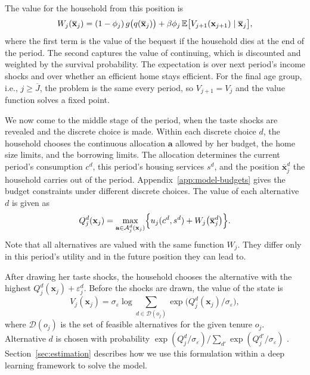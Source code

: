 The value for the household from this position is
\begin{equation}
  W_j(\overline{\mathbf x}_j)=(1-\phi_j)\,g\bigl(q(\overline{\mathbf x}_j)\bigr)
  +\beta\phi_j\,\mathbb E\bigl[V_{j+1}(\mathbf x_{j+1})\mid\overline{\mathbf x}_j\bigr],
  \label{eq:end-value}
\end{equation}
where the  first term is the value of the bequest if the household dies at the end
of the period. The second captures the value of continuing, which is discounted and weighted
by the  survival probability. The expectation  is over next period's income shocks and over
whether an efficient home stays efficient. For the final age group, i.e., $j\geq\overline J$, the
problem is the same every period, so $V_{j+1}=V_j$ and the value function
solves a fixed point.


We now come to the middle stage of the period, when the taste shocks are revealed and the discrete choice is made. Within each discrete choice $d$, the household chooses the continuous allocation $\mathbf a$ allowed by her budget, the home size limits, and the
borrowing limits. The allocation determines the current period's consumption $c^d$, this period's housing
services $s^d$, and the position $\overline{\mathbf x}^d_j$ the household
carries out of the period. Appendix~\ref{app:model-budgets} gives the budget
constraints under different discrete choices. The value of each alternative $d$ is given as
\begin{equation}
  Q_j^d(\mathbf x_j)=\max_{\mathbf a\in\mathcal A_j^d(\mathbf x_j)}
  \Bigl\{u_j(c^d,s^d)+W_j\bigl(\overline{\mathbf x}^d_j\bigr)\Bigr\}.
  \label{eq:choice-value}
\end{equation}
Note that all alternatives are valued with the same function $W_j$.  They differ only
in this period's utility and in the future position they can lead to. 


After drawing her taste shocks, the household chooses the alternative with
the highest $Q_j^d(\mathbf x_j)+\varepsilon_j^d$. Before the shocks are
drawn, the value of the state is
\begin{equation}
  V_j(\mathbf x_j)=\sigma_\varepsilon\log\sum_{d\in\mathcal D(o_j)}
  \exp\!\bigl(Q_j^d(\mathbf x_j)/\sigma_\varepsilon\bigr),
  \label{eq:logsum}
\end{equation}
 where $\mathcal D(o_j)$ is the set of feasible
alternatives for the given tenure $o_j$. Alternative $d$ is chosen with
probability
$\exp(Q_j^d/\sigma_\varepsilon)/\sum_{d'}\exp(Q_j^{d'}/\sigma_\varepsilon)$
\citep{mcfadden1974conditional,rust1987optimal}.
Section~\ref{sec:estimation} describes how we use this formulation within a deep learning framework to solve the model.

